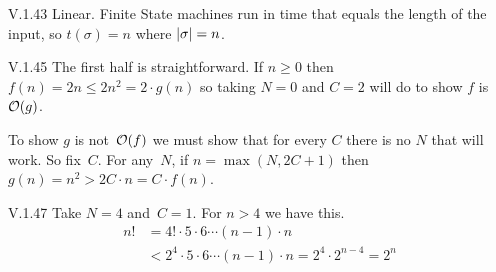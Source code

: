 %
\begin{ans}{V.1.43}
 Linear.
 Finite State machines run in time that equals the length of the input,
 so $t(\sigma)=n$ where $|\sigma|=n$.
 
\end{ans}
%
%
\begin{ans}{V.1.45}
      The first half is straightforward.
      If $n\geq 0$ then $f(n)=2n\leq 2n^2=2\cdot g(n)$ so taking
      $N=0$ and $C=2$ will do to show $f$ is~$\operatorname*{\mathcal{O}}(g)$.

      To show $g$ is not~$\operatorname*{\mathcal{O}}(f)$ we must show that for every $C$ there is
      no $N$ that will work.
      So fix~$C$.
      For any~$N$, if $n=\max(N, 2C+1)$ then $g(n)=n^2>2C\cdot n=C\cdot f(n)$.
    
\end{ans}
%
%
\begin{ans}{V.1.47}
            Take $N=4$ and~$C=1$.
      For $n>4$ we have this.
      \begin{align*}
        n! &=4!\cdot 5\cdot 6\cdots (n-1)\cdot n \\
           &< 2^4\cdot 5\cdot 6\cdots (n-1)\cdot n=2^4\cdot 2^{n-4}=2^n
      \end{align*}
    
\end{ans}
%
%
%
%
